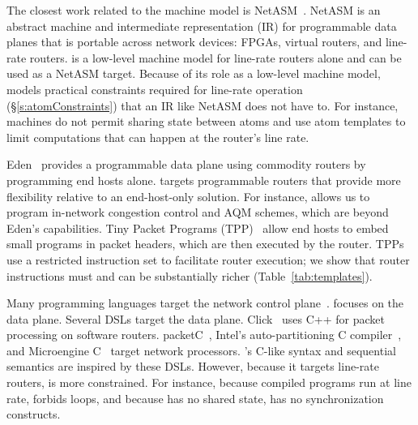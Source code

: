 The closest work related to the \absmachine machine model is
NetASM~\cite{netasm}. NetASM is an abstract machine and intermediate
representation (IR) for programmable data planes that is portable across
network devices: FPGAs, virtual routers, and line-rate routers.  \absmachine
is a low-level machine model for line-rate routers alone and can be used as a
NetASM target. Because of its role as a low-level machine model, \absmachine
models practical constraints required for line-rate operation
(\S\ref{s:atomConstraints}) that an IR like NetASM does not have to. For
instance, \absmachine machines do not permit sharing state between atoms and use
atom templates to limit computations that can happen at the router's line rate.

Eden~\cite{eden} provides a programmable data plane using commodity routers by
programming end hosts alone. \pktlanguage targets programmable routers that
provide more flexibility relative to an end-host-only solution. For instance,
\pktlanguage allows us to program in-network congestion control and AQM
schemes, which are beyond Eden's capabilities.  Tiny Packet Programs
(TPP)~\cite{tpp} allow end hosts to embed small programs in packet headers,
which are then executed by the router. TPPs use a restricted instruction set to
facilitate router execution; we show that router instructions must and can be
substantially richer (Table~\ref{tab:templates}).

 Many programming languages target
the network control plane~\cite{frenetic, maple}. \pktlanguage focuses on the
data plane. Several DSLs target the data plane. Click~\cite{click} uses C++ for
packet processing on software routers. packetC~\cite{packetc}, Intel's
auto-partitioning C compiler~\cite{intel_uiuc_pldi}, and Microengine
C~\cite{microenginec} target network processors. \pktlanguage's C-like syntax
and sequential semantics are inspired by these DSLs. However, because it
targets line-rate routers, \pktlanguage is more constrained. For instance,
because compiled programs run at line rate, \pktlanguage forbids loops, and
because \absmachine has no shared state, \pktlanguage has no synchronization
constructs.

